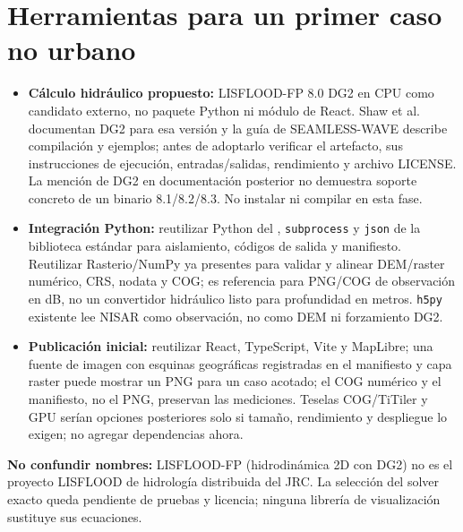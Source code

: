 \documentclass[11pt,a4paper]{article}
\begin{document}
\section{Herramientas para un primer caso no urbano}
\begin{itemize}
\item \textbf{Cálculo hidráulico propuesto:} LISFLOOD-FP 8.0 DG2 en CPU como candidato externo, no paquete Python ni módulo de React. Shaw et al. documentan DG2 para esa versión y la guía de SEAMLESS-WAVE describe compilación y ejemplos; antes de adoptarlo verificar el artefacto, sus instrucciones de ejecución, entradas/salidas, rendimiento y archivo LICENSE. La mención de DG2 en documentación posterior no demuestra soporte concreto de un binario 8.1/8.2/8.3. No instalar ni compilar en esta fase.
\item \textbf{Integración Python:} reutilizar Python del , \texttt{subprocess} y \texttt{json} de la biblioteca estándar para aislamiento, códigos de salida y manifiesto. Reutilizar Rasterio/NumPy ya presentes para validar y alinear DEM/raster numérico, CRS, nodata y COG;  es referencia para PNG/COG de observación en dB, no un convertidor hidráulico listo para profundidad en metros. \texttt{h5py} existente lee NISAR como observación, no como DEM ni forzamiento DG2.
\item \textbf{Publicación inicial:} reutilizar React, TypeScript, Vite y MapLibre; una fuente de imagen con esquinas geográficas registradas en el manifiesto y capa raster puede mostrar un PNG para un caso acotado; el COG numérico y el manifiesto, no el PNG, preservan las mediciones. Teselas COG/TiTiler y GPU serían opciones posteriores solo si tamaño, rendimiento y despliegue lo exigen; no agregar dependencias ahora.
\end{itemize}
\textbf{No confundir nombres:} LISFLOOD-FP (hidrodinámica 2D con DG2) no es el proyecto LISFLOOD de hidrología distribuida del JRC. La selección del solver exacto queda pendiente de pruebas y licencia; ninguna librería de visualización sustituye sus ecuaciones.
\end{document}
